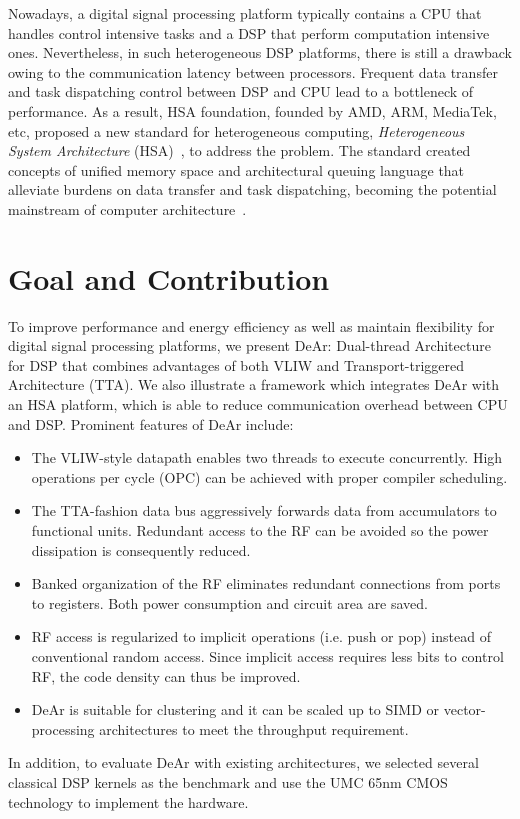         Nowadays, a digital signal processing platform typically contains a CPU that handles control intensive tasks and a DSP that perform computation intensive ones.
        Nevertheless, in such heterogeneous DSP platforms, there is still a drawback owing to the communication latency between processors. 
        Frequent data transfer and task dispatching control between DSP and CPU lead to a  bottleneck of performance. 
        As a result, HSA foundation, founded by AMD, ARM, MediaTek, etc, proposed a new standard for heterogeneous computing, \textit{Heterogeneous System Architecture} (HSA)~\cite{systemspec}, to address the problem. 
        The standard created concepts of unified memory space and architectural queuing language that alleviate burdens on data transfer and task dispatching, becoming the potential mainstream of computer architecture~\cite{mainstream}.
    \section{Goal and Contribution}
        To improve performance and energy efficiency as well as maintain flexibility for digital signal processing platforms, 
        we present DeAr: Dual-thread Architecture for DSP that combines advantages of both VLIW and Transport-triggered Architecture (TTA).
        We also illustrate a framework which integrates DeAr with an HSA platform, which is able to reduce communication overhead between CPU and DSP. 
        Prominent features of DeAr include:
        \begin{itemize}
            \item The VLIW-style datapath enables two threads to execute concurrently. High operations per cycle (OPC) can be achieved with proper compiler scheduling.
            \item The TTA-fashion data bus aggressively forwards data from accumulators to functional units. Redundant access to the RF can be avoided so the power dissipation is consequently reduced.
            \item Banked organization of the RF eliminates redundant connections from ports to registers. Both power consumption and circuit area are saved.
            \item RF access is regularized to implicit operations (i.e. push or pop) instead of conventional random access. Since implicit access requires less bits to control RF, the code density can thus be improved.
            \item DeAr is suitable for clustering and it can be scaled up to SIMD or vector-processing architectures to meet the throughput requirement.
        \end{itemize}
        In addition, to evaluate DeAr with existing architectures, we selected several classical DSP kernels \cite{dspstone} \cite{bdti} as the benchmark and use the UMC 65nm CMOS technology to implement the hardware.

